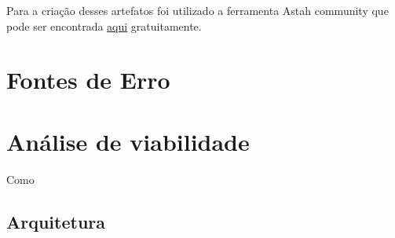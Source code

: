   Para a criação desses artefatos foi utilizado a ferramenta Astah community que pode ser encontrada \href{http://astah.net/download#community}{aqui} gratuitamente.


\section{Fontes de Erro}\label{sol:fontesErro}
\section{Análise de viabilidade}\label{sol:viabilidade}
  Como
\subsection{Arquitetura}
